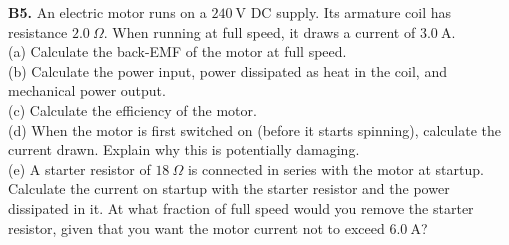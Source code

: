 \begin{exercisebox}[26]
\vspace{0.4cm}

\textbf{B5.} An electric motor runs on a $240\ \text{V}$
DC supply. Its armature coil has resistance
$2.0\ \Omega$. When running at full speed, it draws
a current of $3.0\ \text{A}$.\\[4pt]
(a) Calculate the back-EMF of the motor at full
speed.\\
(b) Calculate the power input, power dissipated as
heat in the coil, and mechanical power output.\\
(c) Calculate the efficiency of the motor.\\
(d) When the motor is first switched on (before it
starts spinning), calculate the current drawn.
Explain why this is potentially damaging.\\
(e) A starter resistor of $18\ \Omega$ is connected
in series with the motor at startup. Calculate the
current on startup with the starter resistor and
the power dissipated in it. At what fraction of
full speed would you remove the starter resistor,
given that you want the motor current not to exceed
$6.0\ \text{A}$?
\hfill{}

\end{exercisebox}
